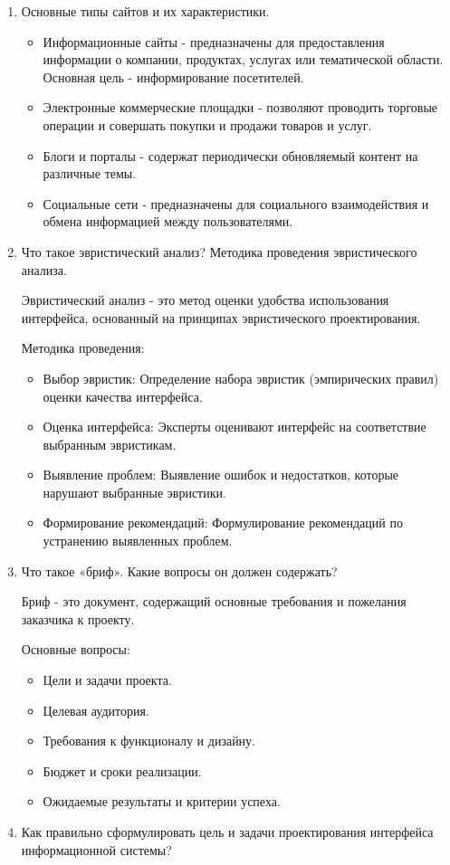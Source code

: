 \begin{enumerate}
    \item Основные типы сайтов и их характеристики.
        \begin{itemize}
            \item Информационные сайты - предназначены для предоставления информации о компании, продуктах, услугах или тематической области. Основная цель - информирование посетителей.
            \item Электронные коммерческие площадки - позволяют проводить торговые операции и совершать покупки и продажи товаров и услуг.
            \item Блоги и порталы - содержат периодически обновляемый контент на различные темы.
            \item Социальные сети - предназначены для социального взаимодействия и обмена информацией между пользователями.
        \end{itemize}
    \item Что такое эвристический анализ? Методика проведения эвристического анализа.

        Эвристический анализ - это метод оценки удобства использования интерфейса, основанный на принципах эвристического проектирования.

        Методика проведения:
        \begin{itemize}
            \item Выбор эвристик: Определение набора эвристик (эмпирических правил) оценки качества интерфейса.
            \item Оценка интерфейса: Эксперты оценивают интерфейс на соответствие выбранным эвристикам.
            \item Выявление проблем: Выявление ошибок и недостатков, которые нарушают выбранные эвристики.
            \item Формирование рекомендаций: Формулирование рекомендаций по устранению выявленных проблем.
        \end{itemize}
    \item Что такое «бриф». Какие вопросы он должен содержать?

        Бриф - это документ, содержащий основные требования и пожелания заказчика к проекту.

        Основные вопросы:
        \begin{itemize}
            \item Цели и задачи проекта.
            \item Целевая аудитория.
            \item Требования к функционалу и дизайну.
            \item Бюджет и сроки реализации.
            \item Ожидаемые результаты и критерии успеха.
        \end{itemize}
    \item Как правильно сформулировать цель и задачи проектирования интерфейса информационной системы?


\end{enumerate}
